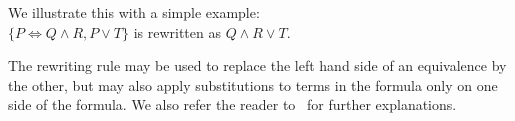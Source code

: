 We illustrate this with a simple example:\\
$\{P \Leftrightarrow Q \wedge R, P \vee T\}$ is rewritten as $Q \wedge R \vee T$. 

The rewriting rule may be used to replace the left hand side of an equivalence by the other, but may also apply substitutions to terms in the formula only on one side of the formula.
We also refer the reader to~\cite{snark-Stickel2000,symbolic-proof} for further explanations.
